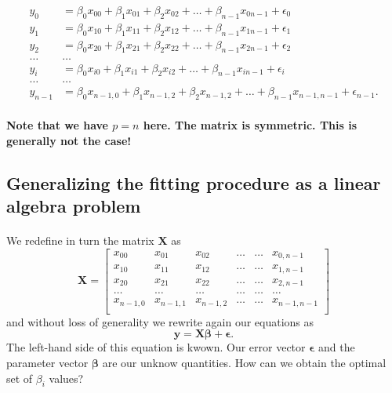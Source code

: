 \documentclass[%
oneside,                 %
final,                   %
10pt]{article}
\begin{document}
\begin{align*}
y_0&=\beta_0x_{00}+\beta_1x_{01}+\beta_2x_{02}+\dots+\beta_{n-1}x_{0n-1}+\epsilon_0\\
y_1&=\beta_0x_{10}+\beta_1x_{11}+\beta_2x_{12}+\dots+\beta_{n-1}x_{1n-1}+\epsilon_1\\
y_2&=\beta_0x_{20}+\beta_1x_{21}+\beta_2x_{22}+\dots+\beta_{n-1}x_{2n-1}+\epsilon_2\\
\dots & \dots \\
y_{i}&=\beta_0x_{i0}+\beta_1x_{i1}+\beta_2x_{i2}+\dots+\beta_{n-1}x_{in-1}+\epsilon_i\\
\dots & \dots \\
y_{n-1}&=\beta_0x_{n-1,0}+\beta_1x_{n-1,2}+\beta_2x_{n-1,2}+\dots+\beta_{n-1}x_{n-1,n-1}+\epsilon_{n-1}.\\
\end{align*}

\textbf{Note that we have $p=n$ here. The matrix is symmetric. This is generally not the case!}




\subsection{Generalizing the fitting procedure as a linear algebra problem}

\paragraph{}
We redefine in turn the matrix $\bm{X}$ as
\[
\bm{X}=
\begin{bmatrix} 
x_{00}& x_{01} &x_{02}& \dots & \dots &x_{0,n-1}\\
x_{10}& x_{11} &x_{12}& \dots & \dots &x_{1,n-1}\\
x_{20}& x_{21} &x_{22}& \dots & \dots &x_{2,n-1}\\                      
\dots& \dots &\dots& \dots & \dots &\dots\\
x_{n-1,0}& x_{n-1,1} &x_{n-1,2}& \dots & \dots &x_{n-1,n-1}\\
\end{bmatrix} 
\]
and without loss of generality we rewrite again  our equations as
\[
\bm{y} = \bm{X}\bm{\beta}+\bm{\epsilon}.
\]
The left-hand side of this equation is kwown. Our error vector $\bm{\epsilon}$ and the parameter vector $\bm{\beta}$ are our unknow quantities. How can we obtain the optimal set of $\beta_i$ values?
\end{document}
